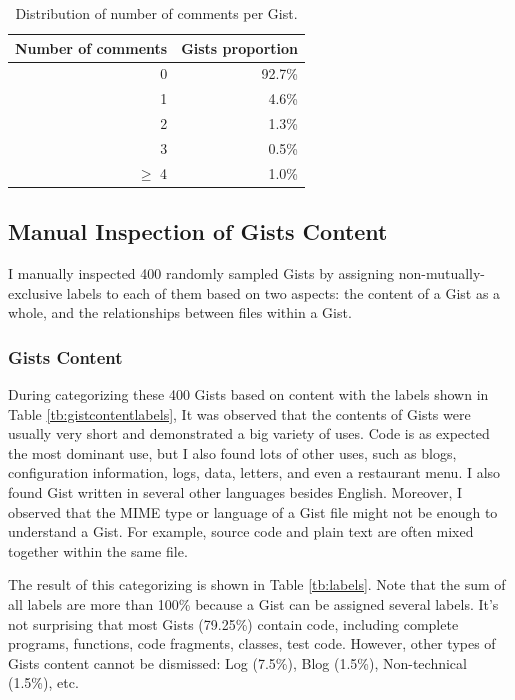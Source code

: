 \begin{table}[!htb]
 \begin{center}
 \begin{tabular}{@{}rr} 
    \textbf{Number of comments} &   \textbf{Gists proportion}\\ \hline
    0 &   92.7\% \\ 
    1 &   4.6\% \\ 
    2 &   1.3\% \\ 
    3 &   0.5\% \\ 
    $\geq$ 4 &   1.0\%\\ \hline
 \end{tabular}
 \end{center}
 \caption{Distribution of number of comments per Gist.}
 \label{tb:comments}
\end{table}

\subsection{Manual Inspection of Gists Content}

I manually inspected 400 randomly sampled Gists by assigning non-mutually-exclusive labels to each of them based on two aspects: the content of a Gist as a whole, and the relationships between files within a Gist. 

\subsubsection{Gists Content}
During categorizing these 400 Gists based on content with the labels shown in Table \ref{tb:gistcontentlabels}, It was observed that the contents of Gists were usually very short and demonstrated a big variety of uses. Code is as expected the most dominant use, but I also found lots of other uses, such as blogs, configuration information, logs, data, letters, and even a restaurant menu. I also found Gist written in several other languages besides English. Moreover, I observed that the MIME type or language of a Gist file might not be enough to understand a Gist. For example, source code and plain text are often mixed together within the same file.

The result of this categorizing is shown in Table \ref{tb:labels}. Note that the sum of all labels are more than 100\% because a Gist can be assigned several labels. It's not surprising that most Gists (79.25\%) contain code, including complete programs, functions, code fragments, classes, test code. However, other types of Gists content cannot be dismissed: Log (7.5\%), Blog (1.5\%), Non-technical (1.5\%), etc.

